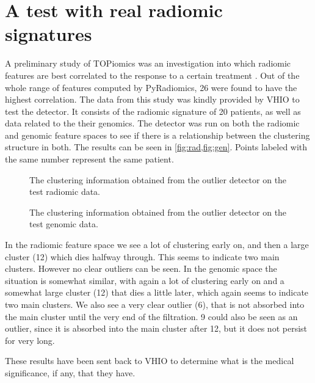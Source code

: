 \documentclass[../main.tex]{subfiles}
\begin{document}
\section{A test with real radiomic signatures}
A preliminary study of TOPiomics was an investigation into which radiomic features are best
correlated to the response to a certain treatment \cite{features}. Out of the whole range
of features computed by \textsf{PyRadiomics}, 26 were found to have the highest
correlation. The data from this study was kindly provided by VHIO to test the detector. It
consists of the radiomic signature of 20 patients, as well as data related to the
their genomics. The detector was run on both the radiomic and genomic feature spaces to
see if there is a relationship between the clustering structure in both. The results can
be seen in \cref{fig:rad,fig:gen}. Points labeled with the same number represent the same
patient. 
\begin{figure}[p]
	\centering \small \sffamily
	
	\caption{The clustering information obtained from the outlier detector on the test
	radiomic data.}
	\label{fig:rad}
\end{figure}

\begin{figure}[p]
	\centering \small \sffamily
	
	\caption{The clustering information obtained from the outlier detector on the test
	genomic data.}
	\label{fig:gen}
\end{figure}

In the radiomic feature space we see a lot of clustering early on, and then a large
cluster (12) which dies halfway through. This seems to indicate two main clusters. However no
clear outliers can be seen. In the genomic space the situation is somewhat similar, with
again a lot of clustering early on and a somewhat large cluster (12) that dies a little later,
which again seems to indicate two main clusters. We also see a very clear outlier (6),
that is not absorbed into the main cluster until the very end of the filtration. 9 could
also be seen as an outlier, since it is absorbed into the main cluster after 12, but it
does not persist for very long.

These results have been sent back to VHIO to determine what is the medical significance,
if any, that they have. 
\end{document}
